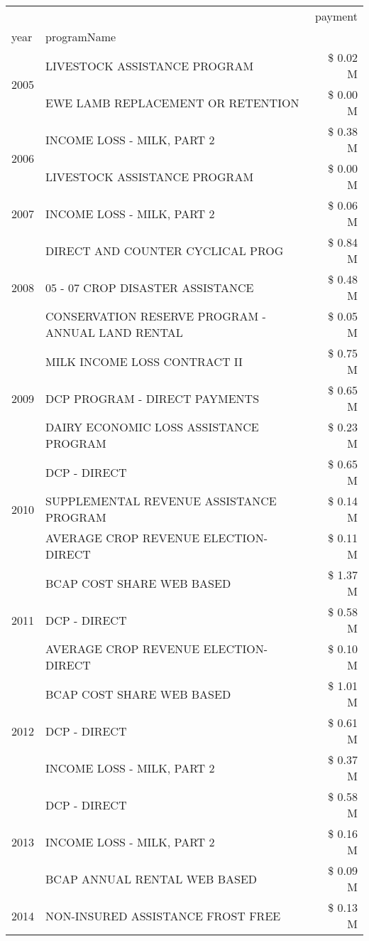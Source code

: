 \begin{tabular}{llr}
\toprule
 &  & payment \\
year & programName &  \\
\midrule
\multirow[t]{2}{*}{2005} & LIVESTOCK ASSISTANCE PROGRAM & \$ 0.02 M \\
 & EWE LAMB REPLACEMENT OR RETENTION & \$ 0.00 M \\
\cline{1-3}
\multirow[t]{2}{*}{2006} & INCOME LOSS - MILK, PART 2 & \$ 0.38 M \\
 & LIVESTOCK ASSISTANCE PROGRAM & \$ 0.00 M \\
\cline{1-3}
2007 & INCOME LOSS - MILK, PART 2 & \$ 0.06 M \\
\cline{1-3}
\multirow[t]{3}{*}{2008} & DIRECT AND COUNTER CYCLICAL PROG & \$ 0.84 M \\
 & 05 - 07 CROP DISASTER ASSISTANCE & \$ 0.48 M \\
 & CONSERVATION RESERVE PROGRAM - ANNUAL LAND RENTAL & \$ 0.05 M \\
\cline{1-3}
\multirow[t]{3}{*}{2009} & MILK INCOME LOSS CONTRACT II & \$ 0.75 M \\
 & DCP PROGRAM - DIRECT PAYMENTS & \$ 0.65 M \\
 & DAIRY ECONOMIC LOSS ASSISTANCE PROGRAM & \$ 0.23 M \\
\cline{1-3}
\multirow[t]{3}{*}{2010} & DCP - DIRECT & \$ 0.65 M \\
 & SUPPLEMENTAL REVENUE ASSISTANCE PROGRAM & \$ 0.14 M \\
 & AVERAGE CROP REVENUE ELECTION-DIRECT & \$ 0.11 M \\
\cline{1-3}
\multirow[t]{3}{*}{2011} & BCAP COST SHARE WEB BASED & \$ 1.37 M \\
 & DCP - DIRECT & \$ 0.58 M \\
 & AVERAGE CROP REVENUE ELECTION-DIRECT & \$ 0.10 M \\
\cline{1-3}
\multirow[t]{3}{*}{2012} & BCAP COST SHARE WEB BASED & \$ 1.01 M \\
 & DCP - DIRECT & \$ 0.61 M \\
 & INCOME LOSS - MILK, PART 2 & \$ 0.37 M \\
\cline{1-3}
\multirow[t]{3}{*}{2013} & DCP - DIRECT & \$ 0.58 M \\
 & INCOME LOSS - MILK, PART 2 & \$ 0.16 M \\
 & BCAP ANNUAL RENTAL WEB BASED & \$ 0.09 M \\
\cline{1-3}
\multirow[t]{3}{*}{2014} & NON-INSURED ASSISTANCE FROST FREE & \$ 0.13 M \\

\end{tabular}

